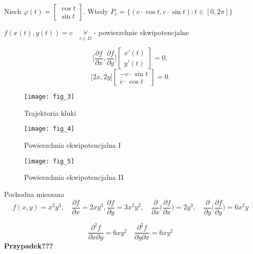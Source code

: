 \documentclass[../main.tex]{subfiles}
\begin{document}
\begin{przyklad}

\end{przyklad}
Niech $\varphi(t) = \left [ \begin{matrix}

\cos{t}\\
\sin{t}\end{matrix}\right ]$. Wtedy $P_c = \{(c \cdot \cos{t},c \cdot \sin{t}): t\in[0,2\pi]\}$

$f(x(t),y(t)) = c \quad\underset{t\in D}{\forall}$ - powierzchnie ekwipotencjalne

\[
    \Big [ \frac{\partial f}{\partial x} , \frac{\partial f}{\partial y} \Big ] \left [ \begin{matrix}
x'(t)\\
    y'(t)\end{matrix}\right ] = 0,
\]
\[
    \Big [ 2x, 2y \Big ] \left [ \begin{matrix}
-c \cdot \sin{t}\\
c \cdot \cos{t}\end{matrix}\right ] = 0.
\]

\pagebreak

\begin{figure}
    \centering
    \texttt{[image: fig\_3]}
    \caption{Trajektoria kluki}
    \label{fig:kulka}
\end{figure}

\begin{figure}
    \centering
    \texttt{[image: fig\_4]}
    \caption{Powierzchnia ekwipotencjalna I}
    \label{fig:ekwiI}
\end{figure}

\begin{figure}
    \centering
    \texttt{[image: fig\_5]}
    \caption{Powierzchnia ekwipotencjalna II}
    \label{fig:ekwiII}
\end{figure}

\pagebreak


\begin{definicja}
    Pochodna mieszana
$$f(x,y) = x^2y^3, \quad \frac{\partial f}{\partial x} = 2xy^3, \frac{\partial f}{\partial y} = 3x^2y^2,\quad
\frac{\partial }{\partial x} \big (\frac{\partial f}{\partial x} \big ) = 2y^3,\quad
\frac{\partial }{\partial y} \big (\frac{\partial f}{\partial y} \big ) = 6x^2y$$

$$\frac{\partial^2 f}{\partial x \partial y} = 6xy^2 \quad \frac{\partial^2 f}{\partial y \partial x} = 6xy^2$$
\textbf{Przypadek???}
\end{definicja}
\end{document}
